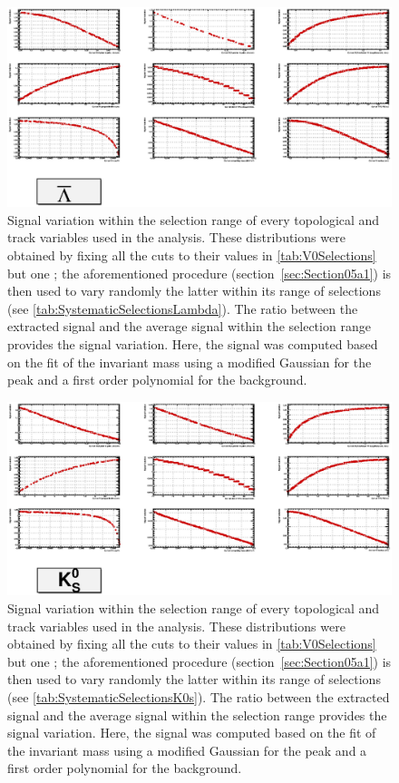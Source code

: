 \begin{landscape}
\begin{figure}[h]
	\centering
	\includegraphics[width=1.45\textwidth]{Figs/Chapter5/SignalVariation_AntiLambda.eps}
\caption{Signal variation within the selection range of every topological and track variables used in the \rmAlambda analysis. These distributions were obtained by fixing all the cuts to their values in \tab\ref{tab:V0Selections} but one ; the aforementioned procedure (section~\ref{sec:Section05a1}) is then used to vary randomly the latter within its range of selections (see \tab\ref{tab:SystematicSelectionsLambda}). The ratio between the extracted signal and the average signal within the selection range provides the signal variation. Here, the signal was computed based on the fit of the invariant mass using a modified Gaussian for the peak and a first order polynomial for the background.}
	\label{fig:SignalVariation_TopoSel_AntiLambda}
\end{figure}

\begin{figure}[h]
	\centering
	\includegraphics[width=1.45\textwidth]{Figs/Chapter5/SignalVariation_K0s.eps}
\caption{Signal variation within the selection range of every topological and track variables used in the \rmKzero analysis. These distributions were obtained by fixing all the cuts to their values in \tab\ref{tab:V0Selections} but one ; the aforementioned procedure (section~\ref{sec:Section05a1}) is then used to vary randomly the latter within its range of selections (see \tab\ref{tab:SystematicSelectionsK0s}). The ratio between the extracted signal and the average signal within the selection range provides the signal variation. Here, the signal was computed based on the fit of the invariant mass using a modified Gaussian for the peak and a first order polynomial for the background.}
	\label{fig:SignalVariation_TopoSel_K0s}
\end{figure}
\end{landscape}
